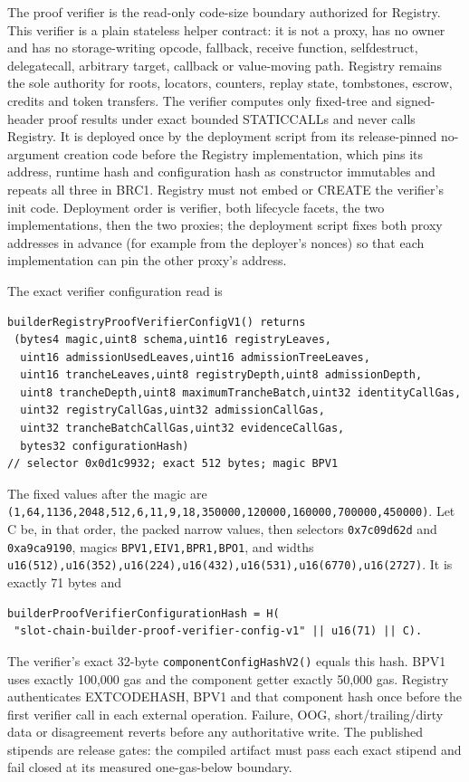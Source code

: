\documentclass[a4paper,11pt]{article}
\newcommand{\code}[1]{\nolinkurl{#1}}
\begin{document}
The proof verifier is the read-only code-size boundary authorized for Registry.
This verifier is a plain stateless helper contract: it is not a proxy, has no
owner and has no storage-writing opcode, fallback, receive function,
selfdestruct, delegatecall, arbitrary target, callback or value-moving path.
Registry remains the sole authority
for roots, locators, counters, replay state, tombstones, escrow, credits and
token transfers.  The verifier computes only fixed-tree and signed-header
proof results under exact bounded STATICCALLs and never calls Registry.
It is deployed once by the deployment script from its release-pinned
no-argument creation code before the Registry implementation, which pins its
address, runtime hash and configuration hash as constructor immutables and
repeats all three in BRC1.  Registry must not embed or CREATE the verifier's
init code.  Deployment order is verifier, both lifecycle facets, the two
implementations, then the two proxies; the deployment script fixes both proxy
addresses in advance (for example from the deployer's nonces) so that each
implementation can pin the other proxy's address.

The exact verifier configuration read is
\begin{verbatim}
builderRegistryProofVerifierConfigV1() returns
 (bytes4 magic,uint8 schema,uint16 registryLeaves,
  uint16 admissionUsedLeaves,uint16 admissionTreeLeaves,
  uint16 trancheLeaves,uint8 registryDepth,uint8 admissionDepth,
  uint8 trancheDepth,uint8 maximumTrancheBatch,uint32 identityCallGas,
  uint32 registryCallGas,uint32 admissionCallGas,
  uint32 trancheBatchCallGas,uint32 evidenceCallGas,
  bytes32 configurationHash)
// selector 0x0d1c9932; exact 512 bytes; magic BPV1
\end{verbatim}
The fixed values after the magic are
\code{(1,64,1136,2048,512,6,11,9,18,350000,120000,160000,700000,450000)}.
Let C be, in that order, the packed narrow values, then selectors
\code{0x7c09d62d} and \code{0xa9ca9190}, magics
\code{BPV1,EIV1,BPR1,BPO1}, and widths
\code{u16(512),u16(352),u16(224),u16(432),u16(531),u16(6770),u16(2727)}.
It is exactly 71 bytes and
\begin{verbatim}
builderProofVerifierConfigurationHash = H(
 "slot-chain-builder-proof-verifier-config-v1" || u16(71) || C).
\end{verbatim}
The verifier's exact 32-byte \code{componentConfigHashV2()} equals this hash.
BPV1 uses exactly 100,000 gas and the component getter exactly 50,000 gas.
Registry authenticates EXTCODEHASH, BPV1 and that component hash once before
the first verifier call in each external operation.  Failure, OOG,
short/trailing/dirty data or disagreement reverts before any authoritative
write.  The published stipends are release gates: the compiled artifact must
pass each exact stipend and fail closed at its measured one-gas-below boundary.
\end{document}
